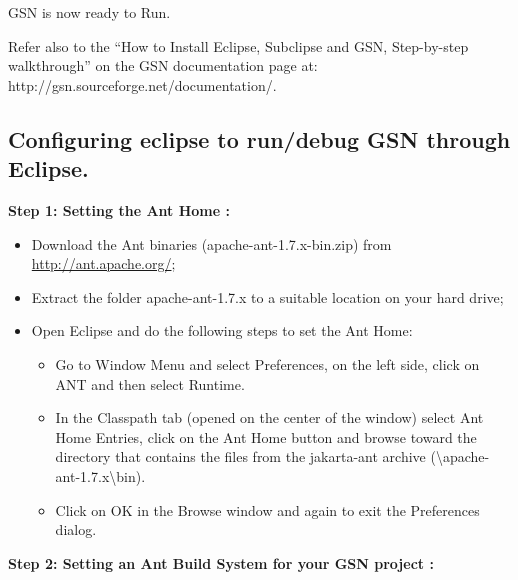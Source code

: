 GSN is now ready to Run.

Refer also to the \textquotedblleft{}How to Install Eclipse, Subclipse
and GSN, Step-by-step walkthrough\textquotedblright{} on the GSN
documentation page at: http://gsn.sourceforge.net/documentation/.

\subsection{Configuring eclipse to run/debug GSN through Eclipse.}

\textbf{Step 1: Setting the Ant Home :}

\begin{itemize}
	\item Download the Ant binaries (apache-ant-1.7.x-bin.zip) from
\url{http://ant.apache.org/};
	\item Extract the folder apache-ant-1.7.x to a suitable location on your
hard drive;
	\item Open Eclipse and do the following steps to set the Ant Home:
\begin{itemize}
	\item Go to Window Menu and select Preferences, on the left side, click on
ANT and then select Runtime.
	\item In the Classpath tab (opened on the center of the window) select Ant
Home Entries, click on the Ant Home button and browse toward the
directory that contains the files from the jakarta-ant archive
(\textbackslash apache-ant-1.7.x\textbackslash bin).
	\item Click on OK in the Browse window and again to exit the Preferences
dialog.
\end{itemize}
\end{itemize}

\textbf{Step 2: Setting an Ant Build System for your GSN project :}

